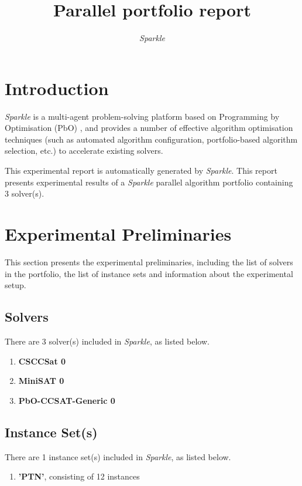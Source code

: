 \documentclass[british]{article}
\title{Parallel portfolio report}
\author{ \emph{Sparkle} }
\begin{document}
\maketitle %

\section{Introduction}
\label{sec:Introduction}

\emph{Sparkle} \cite{Hoos15} is a multi-agent problem-solving platform based on Programming by Optimisation (PbO) \cite{Hoos12}, and provides a number of effective algorithm optimisation techniques (such as automated algorithm configuration, portfolio-based algorithm selection, etc.) to accelerate existing solvers.

This experimental report is automatically generated by \emph{Sparkle}. This report presents experimental results of a \emph{Sparkle} parallel algorithm portfolio containing 3 solver(s).

\section{Experimental Preliminaries}
\label{sec:Experimental_Preliminaries}

This section presents the experimental preliminaries, including the list of solvers in the portfolio, the list of instance sets and information about the experimental setup.

\subsection{Solvers}
\label{sec:Solvers}
There are 3 solver(s) included in \emph{Sparkle}, as listed below.

\begin{enumerate}[nolistsep] 
\item \textbf{CSCCSat 0}
\item \textbf{MiniSAT 0}
\item \textbf{PbO-CCSAT-Generic 0}

\end{enumerate}

\subsection{Instance Set(s)}
\label{sec:Instance_Sets}
There are 1 instance set(s) included in \emph{Sparkle}, as listed below.

\begin{enumerate}
\item \textbf{'PTN'}, consisting of 12 instances

\end{enumerate}
\end{document}

